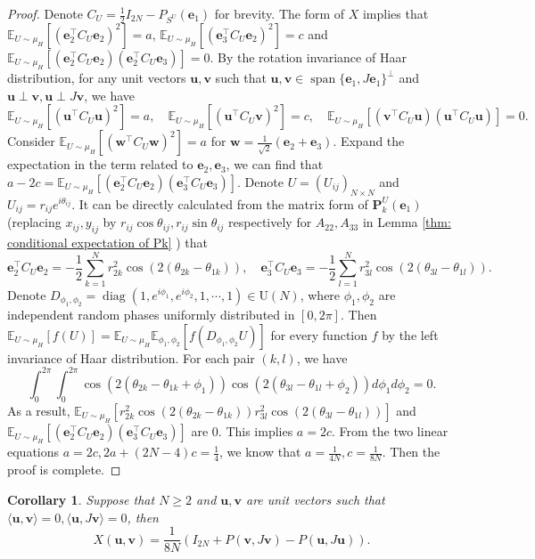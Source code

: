 \documentclass{amsart}
\theoremstyle{plain}
\newtheorem{coro}[theorem]{Corollary}
\theoremstyle{definition}
\theoremstyle{remark}
\DeclareMathOperator{\spanop}{span}
\newcommand{\EE}{\mathbb{E}}
\begin{document}
\begin{proof}
    Denote $C_U=\frac{1}{2}I_{2N}-P_{S^U}(\bm e_1)$ for brevity. The form of $X$ implies that $\EE_{U\sim\mu_H}[(\bm e_2^\top C_U\bm e_2)^2]=a$, $\EE_{U\sim\mu_H}[(\bm e_3^\top C_U\bm e_2)^2]=c$ and $\EE_{U\sim\mu_H}[(\bm e_2^\top C_U\bm e_2)(\bm e_2^\top C_U\bm e_3)]=0$. By the rotation invariance of Haar distribution, for any unit vectors $\bm{u},\bm{v}$ such that $\bm u,\bm v\in \spanop\{\bm e_1,J\bm e_1\}^\perp$ and $\bm{u}\perp\bm{v},\bm{u}\perp J\bm{v}$, we have 
    \[\EE_{U\sim\mu_H}[(\bm{u}^\top C_U\bm{u})^2]=a, \quad \EE_{U\sim\mu_H}[(\bm{u}^\top C_U\bm{v})^2]=c,\quad\EE_{U\sim\mu_H}[(\bm{v}^\top C_U\bm{u})(\bm{u}^\top C_U\bm{u})]=0. \]
    Consider $\EE_{U\sim\mu_H}[(\bm{w}^\top C_U\bm{w})^2]=a$ for $\bm{w}=\frac{1}{\sqrt2}(\bm e_2+\bm e_3)$. Expand the expectation in the term related to $\bm e_2,\bm e_3$, we can find that $a-2c=\EE_{U\sim\mu_H}[(\bm e_2^\top C_U\bm e_2)(\bm e_3^\top C_U\bm e_3)]$. Denote $U=(U_{ij})_{N\times N}$ and $U_{ij}=r_{ij}e^{i\theta_{ij}}$. 
    It can be directly calculated from the matrix form of $\bm P_k^U(\bm e_1)$  (replacing $x_{ij},y_{ij}$ by $r_{ij}\cos\theta_{ij},r_{ij}\sin\theta_{ij}$ respectively for $A_{22},A_{33}$ in Lemma \ref{thm: conditional expectation of Pk} ) that
    \begin{equation}
    \label{eq:Q_u}
       \bm e_2^\top C_U\bm e_2=-\frac{1}{2}\sum\limits_{k=1}^{N}r_{2k}^2\cos(2(\theta_{2k}-\theta_{1k})),\quad\bm e_3^\top C_U\bm e_3=-\frac{1}{2}\sum\limits_{l=1}^{N}r_{3l}^2\cos(2(\theta_{3l}-\theta_{1l})). 
    \end{equation}
    Denote $D_{\phi_1,\phi_2}=\operatorname{diag}(1,e^{i\phi_1},e^{i\phi_2},1,\cdots,1)\in \mathrm U(N)$, where $\phi_1,\phi_2$ are independent random phases uniformly distributed in $[0,2\pi]$. Then $\EE_{U\sim\mu_H}[f(U)]=\EE_{U\sim\mu_H}\EE_{\phi_1,\phi_2}[f(D_{\phi_1,\phi_2}U)]$ for every function $f$ by the left invariance of Haar distribution. For each pair $(k,l)$, we have 
    \[\int_0^{2\pi}\int_0^{2\pi}\cos(2(\theta_{2k}-\theta_{1k}+\phi_1))\cos(2(\theta_{3l}-\theta_{1l}+\phi_2))d\phi_1d\phi_2=0.\]
    As a result, $\EE_{U\sim\mu_H}[r_{2k}^2\cos(2(\theta_{2k}-\theta_{1k}))r_{3l}^2\cos(2(\theta_{3l}-\theta_{1l}))]$
    and $\EE_{U\sim\mu_H}[(\bm e_2^\top C_U\bm e_2)(\bm e_3^\top C_U\bm e_3)]$ are 0. This implies $a=2c$. From the two linear equations $a=2c,2a+(2N-4)c=\frac{1}{4}$, we know that $a=\frac{1}{4N},c=\frac{1}{8N}$. Then the proof is complete. 
\end{proof}
\begin{coro}
    Suppose that $N\geq 2$ and $\bm{u},\bm{v}$ are unit vectors such that $\langle\bm{u},\bm{v}\rangle=0,\langle\bm{u},J\bm{v}\rangle=0$, then 
    \begin{equation}
        \label{eq:X(u,v) final}
        X(\bm{u},\bm{v})=\frac{1}{8N}(I_{2N}+P(\bm{v},J\bm{v})-P(\bm{u},J\bm{u})).
    \end{equation}
\end{coro}
\end{document}
